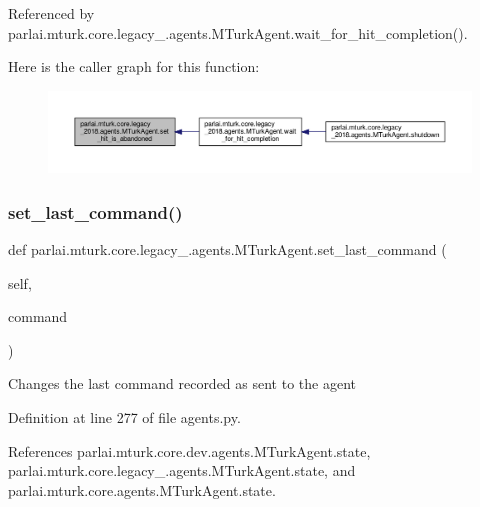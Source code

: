 Referenced by parlai.\+mturk.\+core.\+legacy\+\_.\+agents.\+M\+Turk\+Agent.\+wait\+\_\+for\+\_\+hit\+\_\+completion().

Here is the caller graph for this function\+:
\nopagebreak
\begin{figure}[H]
\begin{center}
\leavevmode
\includegraphics[width=350pt]{classparlai_1_1mturk_1_1core_1_1legacy__2018_1_1agents_1_1MTurkAgent_a748e50850e239f14236d4817e20fa799_icgraph}
\end{center}
\end{figure}
\mbox{\label{classparlai_1_1mturk_1_1core_1_1legacy__2018_1_1agents_1_1MTurkAgent_aff10181ad4291bcab9fb1757751dd35e}} 
\subsubsection{\texorpdfstring{set\+\_\+last\+\_\+command()}{set\_last\_command()}}
{\footnotesize\ttfamily def parlai.\+mturk.\+core.\+legacy\+\_.\+agents.\+M\+Turk\+Agent.\+set\+\_\+last\+\_\+command (\begin{DoxyParamCaption}\item[{}]{self,  }\item[{}]{command }\end{DoxyParamCaption})}

\begin{DoxyVerb}Changes the last command recorded as sent to the agent\end{DoxyVerb}
 

Definition at line 277 of file agents.\+py.



References parlai.\+mturk.\+core.\+dev.\+agents.\+M\+Turk\+Agent.\+state, parlai.\+mturk.\+core.\+legacy\+\_.\+agents.\+M\+Turk\+Agent.\+state, and parlai.\+mturk.\+core.\+agents.\+M\+Turk\+Agent.\+state.

